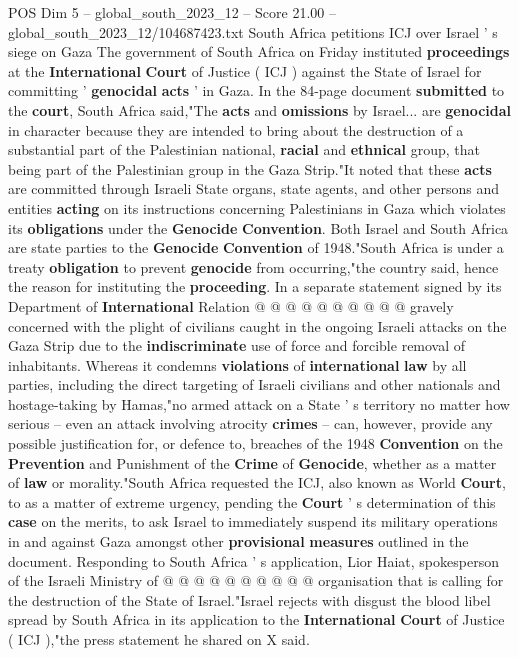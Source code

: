\begin{textsample}{POS Dim 5 – global\_south\_2023\_12 – Score 21.00 – global\_south\_2023\_12/104687423.txt}  \label{ex:f5_pos_103}
South Africa petitions ICJ over Israel ' s siege on Gaza The government of South Africa on Friday instituted \textbf{proceedings} at the \textbf{International} \textbf{Court} of Justice ( ICJ ) against the State of Israel for committing ' \textbf{genocidal} \textbf{acts} ' in Gaza.
In the 84-page document \textbf{submitted} to the \textbf{court}, South Africa said,"The \textbf{acts} and \textbf{omissions} by Israel... are \textbf{genocidal} in character because they are intended to bring about the destruction of a substantial part of the Palestinian national, \textbf{racial} and \textbf{ethnical} group, that being part of the Palestinian group in the Gaza Strip."It noted that these \textbf{acts} are committed through Israeli State organs, state agents, and other persons and entities \textbf{acting} on its instructions concerning Palestinians in Gaza which violates its \textbf{obligations} under the \textbf{Genocide} \textbf{Convention}.
Both Israel and South Africa are state parties to the \textbf{Genocide} \textbf{Convention} of 1948."South Africa is under a treaty \textbf{obligation} to prevent \textbf{genocide} from occurring,"the country said, hence the reason for instituting the \textbf{proceeding}.
In a separate statement signed by its Department of \textbf{International} Relation @ @ @ @ @ @ @ @ @ @ gravely concerned with the plight of civilians caught in the ongoing Israeli attacks on the Gaza Strip due to the \textbf{indiscriminate} use of force and forcible removal of inhabitants.
Whereas it condemns \textbf{violations} of \textbf{international} \textbf{law} by all parties, including the direct targeting of Israeli civilians and other nationals and hostage-taking by Hamas,"no armed attack on a State ' s territory no matter how serious -- even an attack involving atrocity \textbf{crimes} -- can, however, provide any possible justification for, or defence to, breaches of the 1948 \textbf{Convention} on the \textbf{Prevention} and Punishment of the \textbf{Crime} of \textbf{Genocide}, whether as a matter of \textbf{law} or morality."South Africa requested the ICJ, also known as World \textbf{Court}, to as a matter of extreme urgency, pending the \textbf{Court} ' s determination of this \textbf{case} on the merits, to ask Israel to immediately suspend its military operations in and against Gaza amongst other \textbf{provisional} \textbf{measures} outlined in the document.
Responding to South Africa ' s application, Lior Haiat, spokesperson of the Israeli Ministry of @ @ @ @ @ @ @ @ @ @ organisation that is calling for the destruction of the State of Israel."Israel rejects with disgust the blood libel spread by South Africa in its application to the \textbf{International} \textbf{Court} of Justice ( ICJ ),"the press statement he shared on X said.

\end{textsample}
